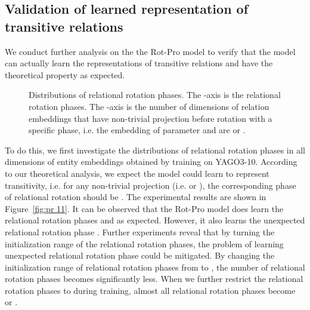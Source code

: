 \documentclass{article}
\begin{document}
\subsection{Validation of learned representation of transitive relations}
We conduct further analysis on the the Rot-Pro model to verify that the model can actually learn the representations of transitive relations and have the theoretical property as expected.
\begin{figure}[tb]
  \centering
{}
\caption{Distributions of relational rotation phases. The -axis is the relational rotation phases. The -axis is the number of dimensions of relation embeddings that have non-trivial projection before rotation with a specific phase, i.e. the embedding of parameter  and  are  or .}
\label{fig:phase r}
\end{figure}
To do this, we first investigate the distributions of relational rotation phases in all dimensions of entity embeddings obtained by training on YAGO3-10. According to our theoretical analysis, we expect the model could learn to represent transitivity, i.e. for any non-trivial projection (i.e.  or ), the corresponding phase of relational rotation should be . The experimental results are shown in Figure~\ref{fig:pr 11}. It can be observed that the Rot-Pro model does learn the relational rotation phases  and  as expected. However, it also learns the unexpected relational rotation phase . Further experiments reveal that by turning the initialization range of the relational rotation phases, the problem of learning unexpected relational rotation phase  could be mitigated. By changing the initialization range of relational rotation phases from   to , the number of relational rotation phases  becomes significantly less. When we further restrict the relational rotation phases to  during training, almost all relational rotation phases become  or .
\end{document}
